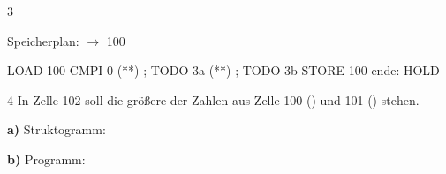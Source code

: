 \documentclass[11pt,a4paper]{article}
\begin{document}
\begin{aufgabe}{3}
\begin{minipage}[t]{0.38\linewidth}
\vspace{1mm}
{\small Speicherplan:  $\to$ 100}\\[1.5mm]
\end{minipage}\hfill
\begin{minipage}[t]{0.58\linewidth}
\vspace{0pt}
\begin{asmluecke}[aboveskip=0mm]
       LOAD 100
       CMPI 0
       (**)   ; TODO 3a
       (**)   ; TODO 3b
       STORE 100
ende:  HOLD
\end{asmluecke}
\end{minipage}
\end{aufgabe}

\begin{aufgabe}{4}
In Zelle 102 soll die größere der Zahlen aus Zelle 100 () und 101 () stehen.\\[1mm]
\begin{minipage}[t]{0.44\linewidth}
\vspace{0pt}
\textbf{a)} Struktogramm:\\[1mm]
\end{minipage}\hfill
\begin{minipage}[t]{0.52\linewidth}
\vspace{0pt}
\textbf{b)} Programm:\\[1mm]
\end{minipage}
\end{aufgabe}
\end{document}

